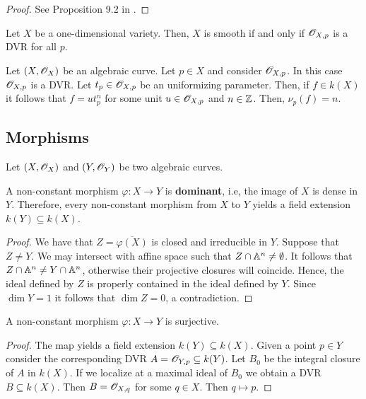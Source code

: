 \begin{proof}
	See Proposition 9.2 in \cite{atiyah}.
\end{proof}
\begin{corollary}\label{cor:smoothness-DVR-curves}
	Let $X$ be a one-dimensional variety. Then, $X$ is smooth if and only if ${\mathscr O}_{X,p}$ is a DVR for all $p$.
\end{corollary}
\begin{example}\label{ex:stalk-of-regular-functions-as-a-DVR}
	Let $(X,{\mathscr O}_{X})$ be an algebraic curve. Let $p \in X$ and consider ${\mathscr O}_{X,p}$. In this case ${\mathscr O}_{X,p}$ is a DVR. Let $t_{p}\in {\mathscr O}_{X,p}$ be an uniformizing parameter. Then, if $f \in k(X)$ it follows that $f = ut_{p}^{n}$ for some  unit $u\in {\mathscr O}_{X,p}$ and $n \in {\mathbb Z}$. Then, $\nu_{p}(f) = n$.
\end{example}
\subsection{Morphisms}
Let $(X,{\mathscr O}_{X})$ and $(Y,{\mathscr O}_{Y})$ be two algebraic curves. 
\begin{proposition}\label{prop:non-constant-morphism-is-dominant}
	A non-constant morphism $\varphi\colon X\to Y$ is \textbf{dominant}, i.e, the image of $X$ is dense in $Y$. Therefore, every non-constant morphism from $X$ to $Y$ yields a field extension $k(Y)\subseteq k(X)$.
\end{proposition}
\begin{proof}
	We have that $Z = \overline{\varphi(X)}$ is closed and irreducible in $Y$. Suppose that $Z \neq Y$. We may intersect with affine space such that $Z \cap {\mathbb A}^{n}\neq \emptyset$. It follows that $Z\cap {\mathbb A}^{n}\neq Y\cap {\mathbb A}^{n}$, otherwise their projective closures will coincide. Hence, the ideal defined by $Z$ is properly contained in the ideal defined by $Y$. Since $\dim Y = 1$ it follows that $\dim Z = 0$, a contradiction.
\end{proof}

\begin{proposition}\label{prop:non-constant-morphism-is-surjective}
	A non-constant morphism $\varphi\colon X\to Y$ is surjective. 
\end{proposition}

\begin{proof}
	The map yields a field extension $k(Y) \subseteq k(X)$. Given a point $p\in Y$ consider the corresponding DVR $A = {\mathscr O}_{Y,p}\subseteq k(Y)$. Let $B_{0}$ be the integral closure of $A$ in $k(X)$. If we localize at a maximal ideal of $B_{0}$ we obtain a DVR $B \subseteq k(X)$. Then $B = {\mathscr O}_{X,q}$ for some $q \in X$. Then $q \mapsto p$. 
\end{proof}


